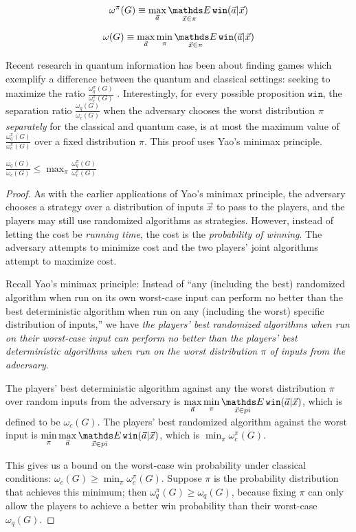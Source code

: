 $$\omega^\pi(G) \equiv \max_{\vec{a}} \Expected_{\vec{x} \in \pi} \texttt{win}(\vec{a}|\vec{x})$$

$$\omega(G) \equiv \max_{\vec{a}} \min_\pi \Expected_{\vec{x} \in \pi} \texttt{win}(\vec{a}|\vec{x})$$

Recent research in quantum information has been about finding games which exemplify a difference between the quantum and classical settings: seeking to maximize the ratio $\frac{\omega_q^\pi(G)}{\omega_c^\pi(G)}$ \cite{ABBSSV}. Interestingly, for every possible proposition $\texttt{win}$, the separation ratio $\frac{\omega_q(G)}{\omega_c(G)}$ when the adversary chooses the worst distribution $\pi$ \emph{separately} for the classical and quantum case, is at most the maximum value of $\frac{\omega_q^\pi(G)}{\omega_c^\pi(G)}$ over a fixed distribution $\pi$. This proof uses Yao's minimax principle.

\begin{theorem}
	$\displaystyle\frac{\omega_q(G)}{\omega_c(G)} \leq \max_\pi \frac{\omega_q^\pi(G)}{\omega_c^\pi(G)}$
\end{theorem}

\begin{proof}

As with the earlier applications of Yao's minimax principle, the adversary chooses a strategy over a distribution of inputs $\vec{x}$ to pass to the players, and the players may still use randomized algorithms as strategies. However, instead of letting the cost be \emph{running time}, the cost is the \emph{probability of winning}. The adversary attempts to minimize cost and the two players' joint algorithms attempt to maximize cost. 

Recall Yao's minimax principle: Instead of ``any (including the best) randomized algorithm when run on its own worst-case input can perform no better than the best deterministic algorithm when run on any (including the worst) specific distribution of inputs,'' we have \emph{the players' best randomized algorithms when run on their worst-case input can perform no better than the players' best deterministic algorithms when run on the worst distribution $\pi$ of inputs from the adversary}. 

The players' best deterministic algorithm against any the worst distribution $\pi$ over random inputs from the adversary is $\displaystyle\max_{\vec{a}} \min_{\pi} \Expected_{\vec{x} \in pi} \texttt{win}(\vec{a}|\vec{x})$, which is defined to be $\omega_c(G)$. The players' best randomized algorithm against the worst input is $\displaystyle\min_\pi \max_{\vec{a}} \Expected_{\vec{x} \in pi} \texttt{win}(\vec{a}|\vec{x})$, which is $\displaystyle\min_\pi \omega^\pi_c(G)$.

This gives us a bound on the worst-case win probability under classical conditions: $\displaystyle\omega_c(G) \geq \min_{\pi} \omega_c^\pi(G)$. Suppose $\pi$ is the probability distribution that achieves this minimum; then $\omega_q^\pi(G) \geq \omega_q(G)$, because fixing $\pi$ can only allow the players to achieve a better win probability than their worst-case $\omega_q(G)$.

\end{proof}


